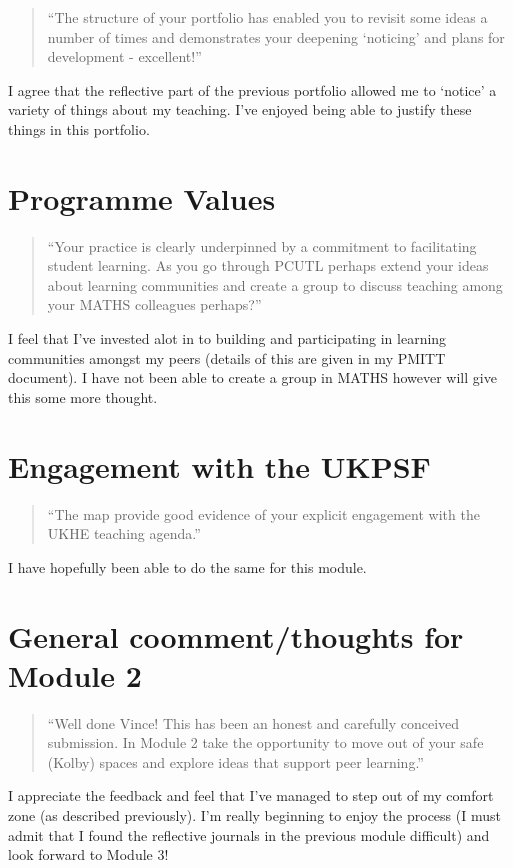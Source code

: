 \documentclass[a4paper,12pt]{article}
\begin{document}
\begin{quote}
    ``The structure of your portfolio has enabled you to revisit some ideas a number of times and demonstrates your deepening `noticing' and plans for development - excellent!''
\end{quote}

I agree that the reflective part of the previous portfolio allowed me to `notice' a variety of things about my teaching. I've enjoyed being able to justify these things in this portfolio.

\section{Programme Values}

\begin{quote}
    ``Your practice is clearly underpinned by a commitment to facilitating student learning. As you go through PCUTL perhaps extend your ideas about learning communities and create a group to discuss teaching among your MATHS colleagues perhaps?''
\end{quote}

I feel that I've invested alot in to building and participating in learning communities amongst my peers (details of this are given in my PMITT document). I have not been able to create a group in MATHS however will give this some more thought.

\section{Engagement with the UKPSF}

\begin{quote}
    ``The map provide good evidence of your explicit engagement with the UKHE teaching agenda.''
\end{quote}

I have hopefully been able to do the same for this module.

\section{General coomment/thoughts for Module 2}

\begin{quote}
    ``Well done Vince! This has been an honest and carefully conceived submission. In Module 2 take the opportunity to move out of your safe (Kolby) spaces and explore ideas that support peer learning.''
\end{quote}

I appreciate the feedback and feel that I've managed to step out of my comfort zone (as described previously). I'm really beginning to enjoy the process (I must admit that I found the reflective journals in the previous module difficult) and look forward to Module 3!
\end{document}
